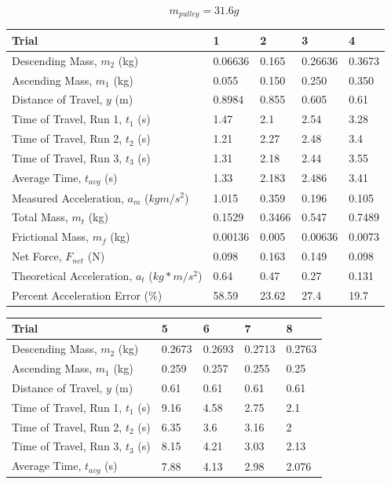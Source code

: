 \documentclass[11pt, titlepage]{article}
\begin{document}
\begin{center}
$$m_{pulley} = 31.6 g$$
\begin{tabular}
{|m{7em}|m{7em}|m{7em}|m{7em}|m{7em}|}
\hline
Trial & 1 & 2 & 3 & 4 \\
\hline
Descending Mass, $m_2$ (kg) & 0.06636 & 0.165 & 0.26636 & 0.3673\\
\hline
Ascending Mass, $m_1$ (kg) & 0.055 & 0.150 & 0.250 & 0.350\\
\hline
Distance of Travel, $y$ (m) & 0.8984 & 0.855 & 0.605 & 0.61\\
\hline
Time of Travel, Run 1, $t_1$ (s) & 1.47 & 2.1 & 2.54 & 3.28\\
\hline
Time of Travel, Run 2, $t_2$ (s) & 1.21 & 2.27 & 2.48 & 3.4\\
\hline
Time of Travel, Run 3, $t_3$ (s) & 1.31 & 2.18 & 2.44 & 3.55\\
\hline
Average Time, $t_{avg}$ (s) & 1.33 & 2.183 & 2.486 & 3.41\\
\hline
Measured Acceleration, $a_m$ ($kgm/s^2$) & 1.015 & 0.359 & 0.196 & 0.105\\
\hline
Total Mass, $m_t$ (kg) & 0.1529 & 0.3466 & 0.547 & 0.7489\\
\hline
Frictional Mass, $m_f$ (kg) & 0.00136 & 0.005 & 0.00636 & 0.0073\\
\hline
Net Force, $F_{net}$ (N) & 0.098 & 0.163 & 0.149 & 0.098\\ 
\hline
Theoretical Acceleration, $a_t$ ($kg*m/s^2$) & 0.64 & 0.47 & 0.27 & 0.131\\
\hline
Percent Acceleration Error (\%) & 58.59 & 23.62 & 27.4 & 19.7\\
\hline
\end{tabular}
\begin{tabular}
{|m{7em}|m{7em}|m{7em}|m{7em}|m{7em}|}
\hline
Trial & 5 & 6 & 7 & 8 \\
\hline
Descending Mass, $m_2$ (kg) & 0.2673 & 0.2693 & 0.2713& 0.2763\\
\hline
Ascending Mass, $m_1$ (kg) & 0.259 & 0.257 & 0.255 & 0.25\\
\hline
Distance of Travel, $y$ (m) & 0.61 & 0.61 & 0.61 & 0.61\\
\hline
Time of Travel, Run 1, $t_1$ (s) & 9.16& 4.58& 2.75& 2.1\\
\hline
Time of Travel, Run 2, $t_2$ (s) & 6.35& 3.6 & 3.16 & 2\\
\hline
Time of Travel, Run 3, $t_3$ (s) & 8.15& 4.21 & 3.03 & 2.13\\
\hline
Average Time, $t_{avg}$ (s) & 7.88 & 4.13 & 2.98 & 2.076 \\

\end{tabular}
\end{center}
\end{document}
